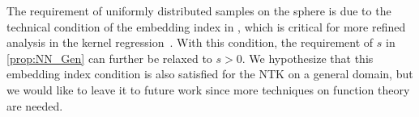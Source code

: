\begin{remark}
  The requirement of uniformly distributed samples on the sphere is due to the technical condition of the embedding index in \citet{li2023_KernelInterpolation},
  which is critical for more refined analysis in the kernel regression~\citep{fischer2020_SobolevNorm}.
  With this condition, the requirement of $s$ in \cref{prop:NN_Gen} can further be relaxed to $s > 0$.
  We hypothesize that this embedding index condition is also satisfied for the NTK on a general domain,
  but we would like to leave it to future work since more techniques on function theory are needed.
\end{remark}

%
%

